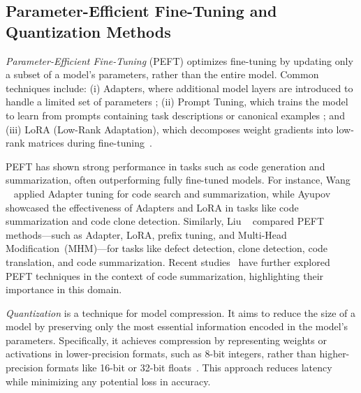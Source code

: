 \subsection{Parameter-Efficient Fine-Tuning and Quantization Methods}
\label{sec:peft-qt}
\textit{Parameter-Efficient Fine-Tuning} (PEFT) optimizes fine-tuning by updating only a subset of a model's parameters, rather than the entire model. Common techniques include: (i) Adapters, where additional model layers are introduced to handle a limited set of parameters \cite{houlsby2019parameter}; (ii) Prompt Tuning, which trains the model to learn from prompts containing task descriptions or canonical examples \cite{lester2021power, li2021prefix}; and (iii)
LoRA (Low-Rank Adaptation), which  decomposes weight gradients into low-rank matrices during fine-tuning~\cite{hu2021lora}. 
 
 PEFT has shown strong performance in tasks such as code generation and summarization, often outperforming fully fine-tuned models. For instance, Wang \etal~\cite{wang2023one} applied Adapter tuning for code search and summarization, while Ayupov~\etal~\cite{ayupov2022parameter} showcased the effectiveness of Adapters and LoRA  in tasks like code summarization and code clone detection. Similarly, Liu \etal~\cite{liu2023empirical} compared PEFT methods—such as Adapter, LoRA, prefix tuning, and Multi-Head Modification~(MHM)—for tasks like defect detection, clone detection, code translation, and code summarization. Recent studies~\cite{sun2023prompt, shi2023towards} have further explored PEFT techniques in the context of code summarization, highlighting their importance in this domain.


\textit{Quantization} is a technique for model compression. It aims to reduce the size of a model by preserving only the most essential information encoded in the model's parameters. Specifically, it achieves compression by representing weights or activations in lower-precision formats, such as 8-bit integers, rather than higher-precision formats like 16-bit or 32-bit floats~\cite{gholami2022survey, zhu2023survey}. This approach reduces latency while minimizing any potential loss in accuracy.

\setlength{\parskip}{1pt}


